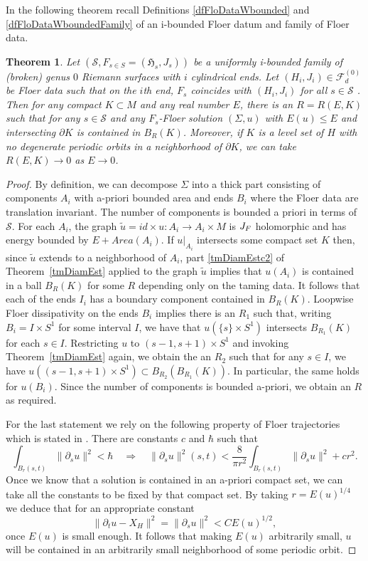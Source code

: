 \documentclass[11pt]{amsart}
\newtheorem{tm}{Theorem}[section]
\theoremstyle{definition}
\theoremstyle{remark}
\begin{document}
In the following theorem recall Definitions \ref{dfFloDataWbounded} and \ref{dfFloDataWboundedFamily} of an i-bounded Floer datum and family of Floer data.
\begin{tm}\label{tmFloSolDiamEst}
Let $(\mathcal{S},F_{s\in S}=(\mathfrak{H}_{s},J_{s}))$  be a uniformly i-bounded family of (broken) genus $0$  Riemann surfaces with $i$ cylindrical ends. Let $(H_i,J_i)\in\mathcal{F}_d^{(0)}$ be Floer data such that on the $i$th end, $F_s$  coincides with $(H_i,J_i)$ for all $s\in\mathcal{S}$ . Then for any compact $K\subset M$ and any real number $E$, there is an $R=R(E,K)$  such that for any $s\in\mathcal{S}$ and any $F_s$-Floer solution $(\Sigma,u)$  with $E(u)\leq E$ and intersecting $\partial K$ is contained in $B_R(K)$. Moreover, if $K$ is a level set of $H$ with no degenerate periodic orbits in a neighborhood of $\partial K$, we can take $R(E,K)\to 0$ as $E\to 0$.
\end{tm}
\begin{proof}
By definition, we can decompose $\Sigma$  into a thick part consisting of components $A_i$ with a-priori bounded area and ends $B_i$ where the Floer data are translation invariant. The number of components is bounded a priori in terms of $\mathcal{S}$. For each $A_i$, the graph $\tilde{u}=id\times u :A_i\to A_i\times M$ is $J_F\emph{}$ holomorphic and has energy bounded by $E+Area(A_i)$. If $u|_{A_i}$ intersects some compact set $K$ then, since $\tilde{u}$ extends to a neighborhood of $A_i$, part \ref{tmDiamEstc2} of Theorem~\ref{tmDiamEst} applied to the graph $\tilde{u}$ implies that $u(A_i)$ is contained in a ball $B_R(K)$  for some $R$ depending only on the taming data. It follows that each of the ends $I_i$ has a boundary component contained in $B_R(K)$.  Loopwise Floer dissipativity on the ends $B_i$ implies there is an $R_1$ such that, writing $B_i=I\times S^1$ for some interval $I$, we have that $u(\{s\}\times S^1)$ intersects $B_{R_1}(K)$ for each $s\in I$. Restricting $u$ to $(s-1,s+1)\times S^1$ and invoking Theorem~\ref{tmDiamEst} again, we obtain the an $R_2$ such that for any $s\in I$, we have $u((s-1,s+1)\times S^1)\subset B_{R_2}(B_{R_1}(K))$.  In particular, the same holds for $u(B_i)$. Since the number of components is bounded a-priori, we obtain an $R$ as required.

For the last statement we rely on the following property of Floer trajectories which is stated in \cite{Salamon1999}. There are constants $c$ and $\hbar$ such that
\[
\int_{B_{r}(s,t)}\|\partial_su\|^2<\hbar\quad\Rightarrow\quad\|\partial_su\|^2(s,t)<\frac8{\pi r^2}\int_{B_{r}(s,t)}\|\partial_su\|^2+cr^2.
\]
Once we know that a solution is contained in an a-priori compact set, we can take all the constants to be fixed by that compact set. By taking $r=E(u)^{1/4}$ we deduce that for an appropriate constant
\[
\|\partial_tu-X_H\|^2=\|\partial_su\|^2<CE(u)^{1/2},
\]
once $E(u)$ is small enough. It follows that making $E(u)$ arbitrarily small, $u$ will be contained in an arbitrarily small neighborhood of some periodic orbit.
\end{proof}
\end{document}
